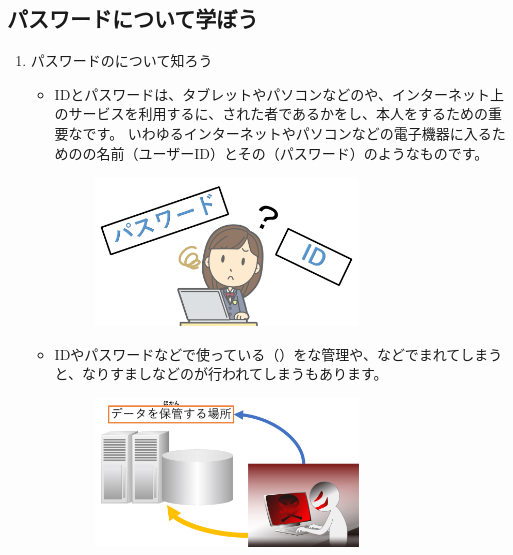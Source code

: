 \documentclass[a4paper,12pt]{jarticle}
\begin{document}
\subsection{パスワードについて学ぼう}
\begin{enumerate}
  \item
  パスワードのについて知ろう
      \begin{itemize}
      \item
          IDとパスワードは、タブレットやパソコンなどのや、インターネット上のサービスを利用するに、された者であるかをし、本人をするための重要なです。 いわゆるインターネットやパソコンなどの電子機器に入るためのの名前（ユーザーID）とその（パスワード）のようなものです。
          \begin{figure}[h]
            \centering
            \begin{minipage}{5.228cm}
              {\upshape
                \includegraphics[width=7.000cm]{pswd_image_imp6.pdf}
                }
            \end{minipage}
          \end{figure}
          \item
              IDやパスワードなどで使っている（）をな管理や、などでまれてしまうと、なりすましなどのが行われてしまうもあります。
          \begin{figure}[h]
            \centering
              \begin{minipage}{5.228cm}
                {\upshape
                  \includegraphics[width=7.000cm]{pswd_image_imp5.pdf}
}
\end{minipage}
\end{figure}
\end{itemize}
\end{enumerate}
\end{document}

